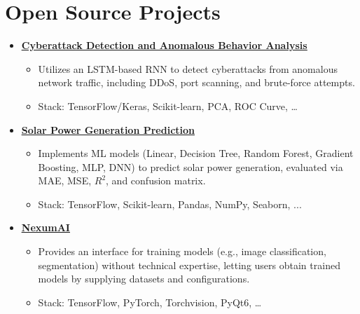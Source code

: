 \documentclass[letter,10pt]{article}
\newcommand{\customsquare}{\raisebox{0.25ex}{\scalebox{0.45}{$\blacksquare$}}}
\begin{document}
\section*{Open Source Projects}
\begin{itemize}[label={\customsquare}]
    \item \href{https://github.com/karami-mehdi/CyberattackDetection}{\underline{\textbf{Cyberattack Detection and Anomalous Behavior Analysis}}}
    \begin{itemize}
        \item Utilizes an LSTM-based RNN to detect cyberattacks from anomalous network traffic, including DDoS, port scanning, and brute-force attempts.
        \item Stack: TensorFlow/Keras, Scikit-learn, PCA, ROC Curve, …
    \end{itemize}

    \item \href{https://github.com/karami-mehdi/SolarPowerGenerationAnalysis}{\underline{\textbf{Solar Power Generation Prediction}}}
    \begin{itemize}
        \item Implements ML models (Linear, Decision Tree, Random Forest, Gradient Boosting, MLP, DNN) to predict solar power generation, evaluated via MAE, MSE, $R^2$, and confusion matrix.
        \item Stack: TensorFlow, Scikit-learn, Pandas, NumPy, Seaborn, ...
    \end{itemize}

    \item \href{https://github.com/AINexumLab/NexumAI}{\underline{\textbf{NexumAI}}}
    \begin{itemize}
        \item Provides an interface for training models (e.g., image classification, segmentation) without technical expertise, letting users obtain trained models by supplying datasets and configurations.
        \item Stack: TensorFlow, PyTorch, Torchvision, PyQt6, …
    \end{itemize}


\end{itemize}
\end{document}
